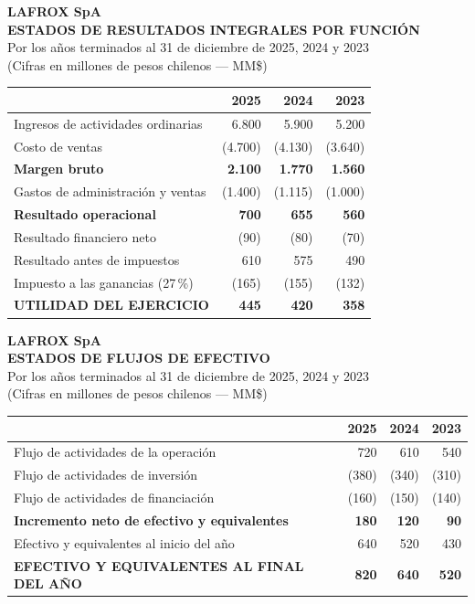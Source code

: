 \documentclass[11pt]{article}
\newcommand{\eeffhead}[2]{%
  \begin{center}
    {\large\bfseries LAFROX SpA}\\[3pt]
    {\bfseries #1}\\[2pt]
    #2\\[2pt]
    {\small (Cifras en millones de pesos chilenos --- MM\$)}
  \end{center}\vspace{2pt}}
\newcommand{\tot}[4]{\textbf{#1} & \textbf{#2} & \textbf{#3} & \textbf{#4}\\}
\newcommand{\cabeera}{\toprule & \textbf{2025} & \textbf{2024} & \textbf{2023}\\\midrule}
\begin{document}
\eeffhead{ESTADOS DE RESULTADOS INTEGRALES POR FUNCIÓN}{Por los años terminados al 31 de diciembre de 2025, 2024 y 2023}
\noindent\begin{tabularx}{\linewidth}{@{}X R R R@{}}
  \cabeera
  Ingresos de actividades ordinarias & 6.800 & 5.900 & 5.200\\
  Costo de ventas & (4.700) & (4.130) & (3.640)\\
  \tot{Margen bruto}{2.100}{1.770}{1.560}
  Gastos de administración y ventas & (1.400) & (1.115) & (1.000)\\
  \tot{Resultado operacional}{700}{655}{560}
  Resultado financiero neto & (90) & (80) & (70)\\
  Resultado antes de impuestos & 610 & 575 & 490\\
  Impuesto a las ganancias (27\,\%) & (165) & (155) & (132)\\
  \midrule
  \tot{UTILIDAD DEL EJERCICIO}{445}{420}{358}
  \bottomrule
\end{tabularx}

\vspace{10pt}
\clearpage

\eeffhead{ESTADOS DE FLUJOS DE EFECTIVO}{Por los años terminados al 31 de diciembre de 2025, 2024 y 2023}
\noindent\begin{tabularx}{\linewidth}{@{}X R R R@{}}
  \cabeera
  Flujo de actividades de la operación & 720 & 610 & 540\\
  Flujo de actividades de inversión & (380) & (340) & (310)\\
  Flujo de actividades de financiación & (160) & (150) & (140)\\
  \midrule
  \tot{Incremento neto de efectivo y equivalentes}{180}{120}{90}
  Efectivo y equivalentes al inicio del año & 640 & 520 & 430\\
  \midrule
  \tot{EFECTIVO Y EQUIVALENTES AL FINAL DEL AÑO}{820}{640}{520}
  \bottomrule
\end{tabularx}

\vspace{10pt}
\clearpage
\end{document}

